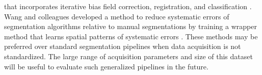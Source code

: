 that incorporates iterative bias field correction, registration, and classification \cite{optimize}. Wang and colleagues developed a method to reduce systematic errors of segmentation algorithms relative to manual segmentations by training a wrapper method that learns spatial patterns of systematic errors \cite{Wang2011}. These methods may be preferred over standard segmentation pipelines when data acquisition is not standardized. The large range of acquisition parameters and size of this dataset will be useful to evaluate such generalized pipelines in the future.